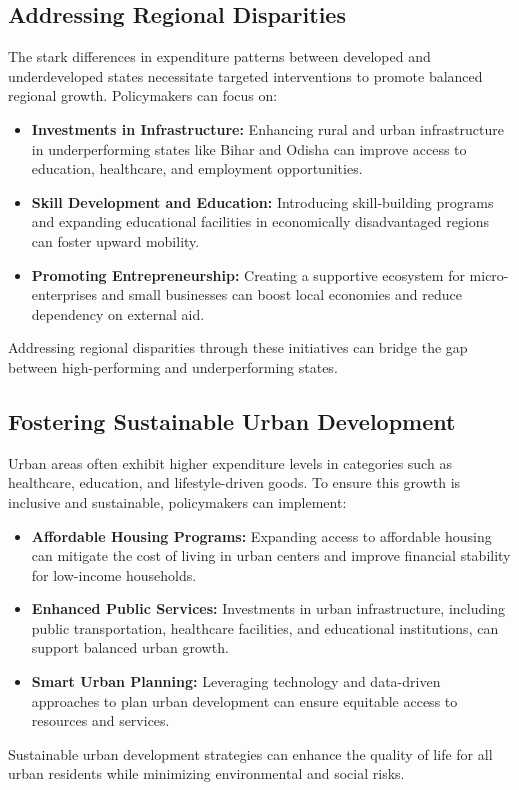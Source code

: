 \documentclass{article}
\begin{document}
\subsection{Addressing Regional Disparities}
The stark differences in expenditure patterns between developed and underdeveloped states necessitate targeted interventions to promote balanced regional growth. Policymakers can focus on:
\begin{itemize}
	\item \textbf{Investments in Infrastructure:} 
	Enhancing rural and urban infrastructure in underperforming states like Bihar and Odisha can improve access to education, healthcare, and employment opportunities.
	\item \textbf{Skill Development and Education:} 
	Introducing skill-building programs and expanding educational facilities in economically disadvantaged regions can foster upward mobility.
	\item \textbf{Promoting Entrepreneurship:} 
	Creating a supportive ecosystem for micro-enterprises and small businesses can boost local economies and reduce dependency on external aid.
\end{itemize}
Addressing regional disparities through these initiatives can bridge the gap between high-performing and underperforming states.

\subsection{Fostering Sustainable Urban Development}
Urban areas often exhibit higher expenditure levels in categories such as healthcare, education, and lifestyle-driven goods. To ensure this growth is inclusive and sustainable, policymakers can implement:
\begin{itemize}
	\item \textbf{Affordable Housing Programs:} 
	Expanding access to affordable housing can mitigate the cost of living in urban centers and improve financial stability for low-income households.
	\item \textbf{Enhanced Public Services:} 
	Investments in urban infrastructure, including public transportation, healthcare facilities, and educational institutions, can support balanced urban growth.
	\item \textbf{Smart Urban Planning:} 
	Leveraging technology and data-driven approaches to plan urban development can ensure equitable access to resources and services.
\end{itemize}
Sustainable urban development strategies can enhance the quality of life for all urban residents while minimizing environmental and social risks.
\end{document}
